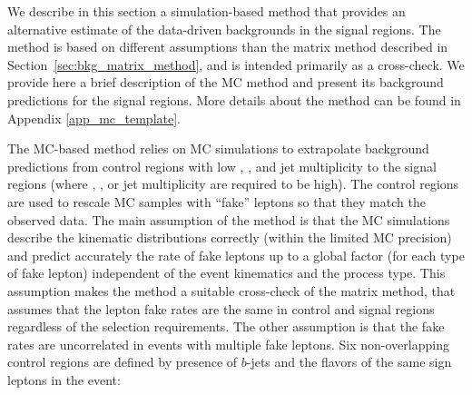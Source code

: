 



We describe in this section a simulation-based method that provides an alternative estimate of the data-driven backgrounds in the signal regions. 
The method is based on different assumptions than the matrix method described in Section~\ref{sec:bkg_matrix_method}, 
and is intended primarily as a cross-check. 
We provide here a brief description of the MC method and present its background predictions for the signal regions. More details about the method can be found in Appendix \ref{app_mc_template}.

The MC-based method relies on MC simulations to extrapolate background predictions from control regions with low \met , \meff , 
and jet multiplicity to the signal regions (where \met , \meff , or jet multiplicity are required to be high). 
The control regions are used to rescale MC samples with ``fake'' leptons so that they match the observed data. 
The main assumption of the method is that the MC simulations describe the kinematic distributions correctly (within the limited MC precision) 
and predict accurately the rate of fake leptons up to a global factor (for each type of fake lepton) independent of the event kinematics and the process type. 
This assumption makes the method a suitable cross-check of the matrix method, that assumes that the lepton fake rates 
are the same in control and signal regions regardless of the selection requirements. 
The other assumption is that the fake rates are uncorrelated in events with multiple fake leptons.
Six non-overlapping control regions are defined by presence of $b$-jets and the flavors of the same sign leptons in the event:

